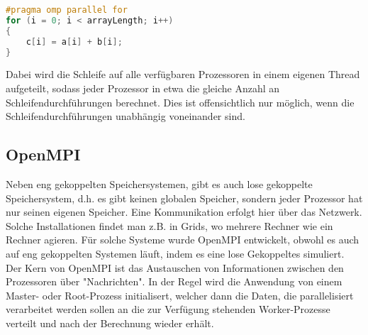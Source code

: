 \begin{lstlisting}[language=C]
#pragma omp parallel for
for (i = 0; i < arrayLength; i++)
{
    c[i] = a[i] + b[i];
}
\end{lstlisting}

Dabei wird die Schleife auf alle verfügbaren Prozessoren in einem eigenen Thread aufgeteilt, sodass jeder Prozessor in etwa die gleiche Anzahl an Schleifendurchführungen berechnet. Dies ist offensichtlich nur möglich, wenn die Schleifendurchführungen unabhängig voneinander sind.

\subsection{OpenMPI}
Neben eng gekoppelten Speichersystemen, gibt es auch lose gekoppelte Speichersystem, d.h. es gibt keinen globalen Speicher, sondern jeder Prozessor hat nur seinen eigenen Speicher. Eine Kommunikation erfolgt hier über das Netzwerk. Solche Installationen findet man z.B. in Grids, wo mehrere Rechner wie ein Rechner agieren. Für solche Systeme wurde OpenMPI entwickelt, obwohl es auch auf eng gekoppelten Systemen läuft, indem es eine lose Gekoppeltes simuliert.\\
Der Kern von OpenMPI ist das Austauschen von Informationen zwischen den Prozessoren über "Nachrichten". In der Regel wird die Anwendung von einem Master- oder Root-Prozess initialisert, welcher dann die Daten, die parallelisiert verarbeitet werden sollen an die zur Verfügung stehenden Worker-Prozesse verteilt und nach der Berechnung wieder erhält.

